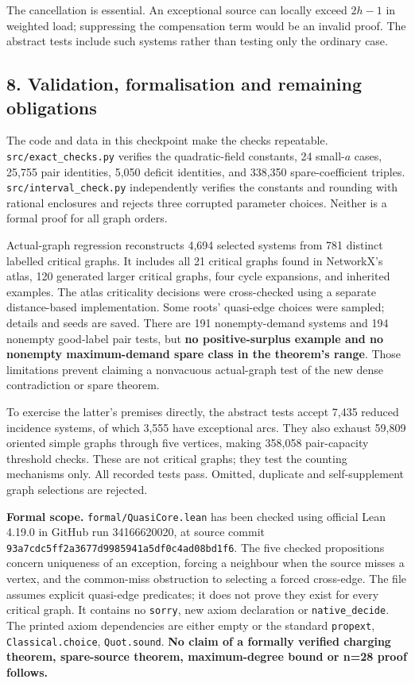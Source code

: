 \documentclass[
  11pt,
  a4paper,
]{article}
\begin{document}
The cancellation is essential. An exceptional source can locally exceed
\(2h-1\) in weighted load; suppressing the compensation term would be an
invalid proof. The abstract tests include such systems rather than
testing only the ordinary case.

\subsection{8. Validation, formalisation and remaining
obligations}\label{validation-formalisation-and-remaining-obligations}

The code and data in this checkpoint make the checks repeatable.
\texttt{src/exact\_checks.py} verifies the quadratic-field constants, 24
small-\(a\) cases, 25,755 pair identities, 5,050 deficit identities, and
338,350 spare-coefficient triples. \texttt{src/interval\_check.py}
independently verifies the constants and rounding with rational
enclosures and rejects three corrupted parameter choices. Neither is a
formal proof for all graph orders.

Actual-graph regression reconstructs 4,694 selected systems from 781
distinct labelled critical graphs. It includes all 21 critical graphs
found in NetworkX's atlas, 120 generated larger critical graphs, four
cycle expansions, and inherited examples. The atlas criticality
decisions were cross-checked using a separate distance-based
implementation. Some roots' quasi-edge choices were sampled; details and
seeds are saved. There are 191 nonempty-demand systems and 194 nonempty
good-label pair tests, but \textbf{no positive-surplus example and no
nonempty maximum-demand spare class in the theorem's range}. Those
limitations prevent claiming a nonvacuous actual-graph test of the new
dense contradiction or spare theorem.

To exercise the latter's premises directly, the abstract tests accept
7,435 reduced incidence systems, of which 3,555 have exceptional arcs.
They also exhaust 59,809 oriented simple graphs through five vertices,
making 358,058 pair-capacity threshold checks. These are not critical
graphs; they test the counting mechanisms only. All recorded tests pass.
Omitted, duplicate and self-supplement graph selections are rejected.

\textbf{Formal scope.} \texttt{formal/QuasiCore.lean} has been checked
using official Lean 4.19.0 in GitHub run 34166620020, at source commit
\texttt{93a7cdc5ff2a3677d9985941a5df0c4ad08bd1f6}. The five checked
propositions concern uniqueness of an exception, forcing a neighbour
when the source misses a vertex, and the common-miss obstruction to
selecting a forced cross-edge. The file assumes explicit quasi-edge
predicates; it does not prove they exist for every critical graph. It
contains no \texttt{sorry}, new axiom declaration or
\texttt{native\_decide}. The printed axiom dependencies are either empty
or the standard \texttt{propext}, \texttt{Classical.choice},
\texttt{Quot.sound}. \textbf{No claim of a formally verified charging
theorem, spare-source theorem, maximum-degree bound or n=28 proof
follows.}
\end{document}
